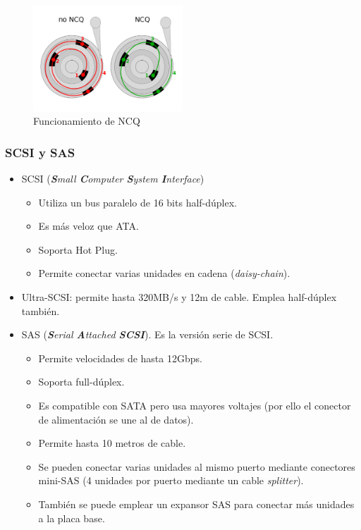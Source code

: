 \documentclass[12pt,spanish]{article}
\begin{document}
\begin{figure}[H]
	\centering
	\includegraphics[width=0.5\textwidth]{ncq.png}
	\caption{Funcionamiento de NCQ}
\end{figure}

\subsubsection{SCSI y SAS}

\begin{itemize}
	\item SCSI (\textit{\textbf{S}mall \textbf{C}omputer \textbf{S}ystem \textbf{I}nterface})
	\begin{itemize}
		\item Utiliza un bus paralelo de 16 bits half-dúplex.
		\item Es más veloz que ATA.
		\item Soporta Hot Plug.
		\item Permite conectar varias unidades en cadena (\textit{daisy-chain}).
	\end{itemize}
	\item Ultra-SCSI: permite hasta 320MB/s y 12m de cable. Emplea half-dúplex también.
	\item SAS (\textit{\textbf{S}erial \textbf{A}ttached \textbf{SCSI}}). Es la versión serie de SCSI.
	\begin{itemize}
		\item Permite velocidades de hasta 12Gbps.
		\item Soporta full-dúplex.
		\item Es compatible con SATA pero usa mayores voltajes (por ello el conector de alimentación se une al de datos).
		\item Permite hasta 10 metros de cable.
		\item Se pueden conectar varias unidades al mismo puerto mediante conectores mini-SAS (4 unidades por puerto mediante un cable \textit{splitter}).
		\item También se puede emplear un expansor SAS para conectar más unidades a la placa base.
	\end{itemize}
\end{itemize}
\end{document}
